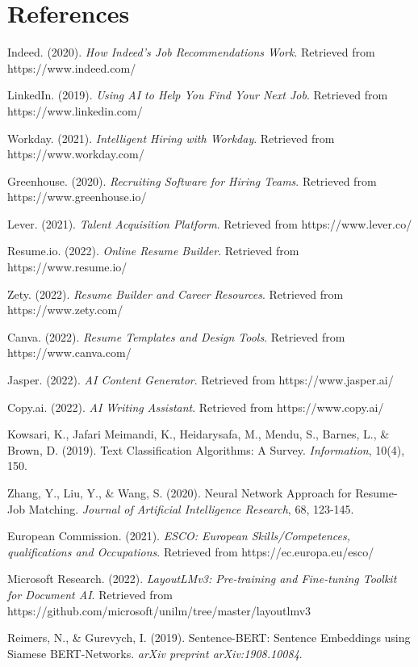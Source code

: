 \documentclass[12pt,a4paper]{report}
\begin{document}
\chapter{References}

Indeed. (2020). \textit{How Indeed's Job Recommendations Work}. Retrieved from https://www.indeed.com/

LinkedIn. (2019). \textit{Using AI to Help You Find Your Next Job}. Retrieved from https://www.linkedin.com/

Workday. (2021). \textit{Intelligent Hiring with Workday}. Retrieved from https://www.workday.com/

Greenhouse. (2020). \textit{Recruiting Software for Hiring Teams}. Retrieved from https://www.greenhouse.io/

Lever. (2021). \textit{Talent Acquisition Platform}. Retrieved from https://www.lever.co/

Resume.io. (2022). \textit{Online Resume Builder}. Retrieved from https://www.resume.io/

Zety. (2022). \textit{Resume Builder and Career Resources}. Retrieved from https://www.zety.com/

Canva. (2022). \textit{Resume Templates and Design Tools}. Retrieved from https://www.canva.com/

Jasper. (2022). \textit{AI Content Generator}. Retrieved from https://www.jasper.ai/

Copy.ai. (2022). \textit{AI Writing Assistant}. Retrieved from https://www.copy.ai/

Kowsari, K., Jafari Meimandi, K., Heidarysafa, M., Mendu, S., Barnes, L., \& Brown, D. (2019). Text Classification Algorithms: A Survey. \textit{Information}, 10(4), 150.

Zhang, Y., Liu, Y., \& Wang, S. (2020). Neural Network Approach for Resume-Job Matching. \textit{Journal of Artificial Intelligence Research}, 68, 123-145.

European Commission. (2021). \textit{ESCO: European Skills/Competences, qualifications and Occupations}. Retrieved from https://ec.europa.eu/esco/

Microsoft Research. (2022). \textit{LayoutLMv3: Pre-training and Fine-tuning Toolkit for Document AI}. Retrieved from https://github.com/microsoft/unilm/tree/master/layoutlmv3

Reimers, N., \& Gurevych, I. (2019). Sentence-BERT: Sentence Embeddings using Siamese BERT-Networks. \textit{arXiv preprint arXiv:1908.10084}.
\end{document}
